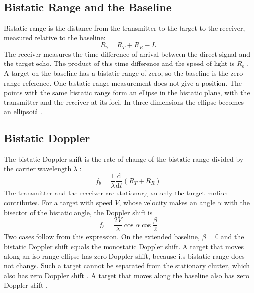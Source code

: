 \subsection{Bistatic Range and the Baseline}
\label{subsec:th.geometry.range}
\todo{}
Bistatic range is the distance from the transmitter to the target to the receiver, measured relative to the baseline:
\begin{equation}
    R_b = R_T + R_R - L
    \label{eq:bistatic-range}
\end{equation}
The receiver measures the time difference of arrival between the direct signal and the target echo. The product of this time difference and the speed of light is $R_b$ \citep{kuschel2019}. A target on the baseline has a bistatic range of zero, so the baseline is the zero-range reference. One bistatic range measurement does not give a position. The points with the same bistatic range form an ellipse in the bistatic plane, with the transmitter and the receiver at its foci. In three dimensions the ellipse becomes an ellipsoid \citep{kuschel2019}.

\subsection{Bistatic Doppler}
\label{subsec:th.geometry.doppler}
\todo{}
The bistatic Doppler shift is the rate of change of the bistatic range divided by the carrier wavelength $\lambda$ \citep{kuschel2019}:
\begin{equation}
    f_b = \frac{1}{\lambda} \frac{\mathrm{d}}{\mathrm{d}t} \left( R_T + R_R \right)
    \label{eq:bistatic-doppler}
\end{equation}
The transmitter and the receiver are stationary, so only the target motion contributes. For a target with speed $V$, whose velocity makes an angle $\alpha$ with the bisector of the bistatic angle, the Doppler shift is \citep{kuschel2019}
\begin{equation}
    f_b = \frac{2V}{\lambda} \cos\alpha \cos\frac{\beta}{2}
    \label{eq:bistatic-doppler-geometry}
\end{equation}
Two cases follow from this expression. On the extended baseline, $\beta = 0$ and the bistatic Doppler shift equals the monostatic Doppler shift. A target that moves along an iso-range ellipse has zero Doppler shift, because its bistatic range does not change. Such a target cannot be separated from the stationary clutter, which also has zero Doppler shift \citep{kuschel2019}. A target that moves along the baseline also has zero Doppler shift \citep{kuschel2019}.

